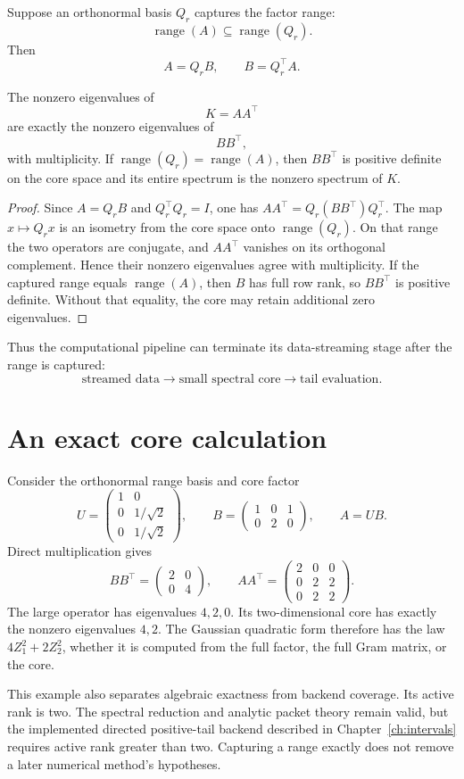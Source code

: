 Suppose an orthonormal basis \(Q_r\) captures the factor range:
\[
\operatorname{range}(A)\subseteq\operatorname{range}(Q_r).
\]
Then
\[
A=Q_rB,
\qquad
B=Q_r^\top A.
\]

\begin{theorem}\label{claim:final-21-1}
The nonzero eigenvalues of
\[
K=AA^\top
\]
are exactly the nonzero eigenvalues of
\[
BB^\top,
\]
with multiplicity. If $\operatorname{range}(Q_r)=\operatorname{range}(A)$,
then $BB^\top$ is positive definite on the core space and its entire spectrum
is the nonzero spectrum of $K$.
\end{theorem}

\begin{proof}
Since $A=Q_rB$ and $Q_r^\top Q_r=I$, one has
$AA^\top=Q_r(BB^\top)Q_r^\top$. The map $x\mapsto Q_rx$ is an isometry
from the core space onto $\operatorname{range}(Q_r)$. On that range the two
operators are conjugate, and $AA^\top$ vanishes on its orthogonal complement.
Hence their nonzero eigenvalues agree with multiplicity. If the captured
range equals $\operatorname{range}(A)$, then $B$ has full row rank, so
$BB^\top$ is positive definite. Without that equality, the core may retain
additional zero eigenvalues.
\end{proof}


Thus the computational pipeline can terminate its data-streaming stage after
the range is captured:
\[
\boxed{
\text{streamed data}
\to
\text{small spectral core}
\to
\text{tail evaluation}.
}
\]



\section{An exact core calculation}
Consider the orthonormal range basis and core factor
\[
U=\begin{pmatrix}1&0\\0&1/\sqrt2\\0&1/\sqrt2\end{pmatrix},
\qquad
B=\begin{pmatrix}1&0&1\\0&2&0\end{pmatrix},
\qquad A=UB.
\]
Direct multiplication gives
\[
BB^\top=\begin{pmatrix}2&0\\0&4\end{pmatrix},
\qquad
AA^\top=\begin{pmatrix}2&0&0\\0&2&2\\0&2&2\end{pmatrix}.
\]
The large operator has eigenvalues $4,2,0$. Its two-dimensional core has
exactly the nonzero eigenvalues $4,2$. The Gaussian quadratic form therefore
has the law $4Z_1^2+2Z_2^2$, whether it is computed from the full factor, the
full Gram matrix, or the core.

This example also separates algebraic exactness from backend coverage. Its
active rank is two. The spectral reduction and analytic packet theory remain
valid, but the implemented directed positive-tail backend described in
Chapter~\ref{ch:intervals} requires active rank greater than two. Capturing a
range exactly does not remove a later numerical method's hypotheses.
